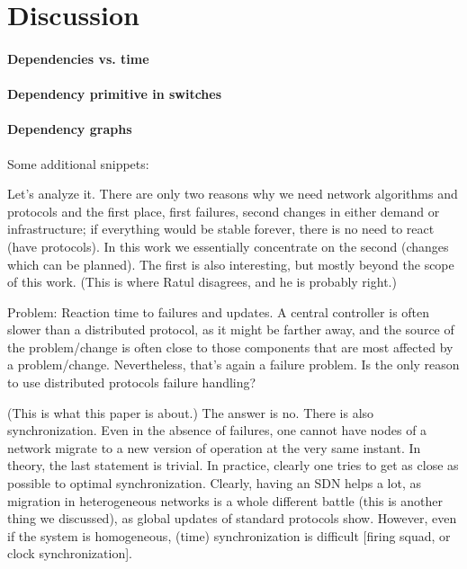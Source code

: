 \section{Discussion}
\label{sec:discussion}

\paragraph{Dependencies vs. time}

\paragraph{Dependency primitive in switches}

\paragraph{Dependency graphs}


Some additional snippets:

Let’s analyze it. There are only two reasons why we need network algorithms and protocols and the first place, first failures, second changes in either demand or infrastructure; if everything would be stable forever, there is no need to react (have protocols). In this work we essentially concentrate on the second (changes which can be planned). The first is also interesting, but mostly beyond the scope of this work. (This is where Ratul disagrees, and he is probably right.)

Problem: Reaction time to failures and updates. A central controller is often slower than a distributed protocol, as it might be farther away, and the source of the problem/change is often close to those components that are most affected by a problem/change. Nevertheless, that’s again a failure problem. Is the only reason to use distributed protocols failure handling?

(This is what this paper is about.) The answer is no. There is also synchronization. Even in the absence of failures, one cannot have nodes of a network migrate to a new version of operation at the very same instant. In theory, the last statement is trivial. In practice, clearly one tries to get as close as possible to optimal synchronization. Clearly, having an SDN helps a lot, as migration in heterogeneous networks is a whole different battle (this is another thing we discussed), as global updates of standard protocols show. However, even if the system is homogeneous, (time) synchronization is difficult [firing squad, or clock synchronization].


